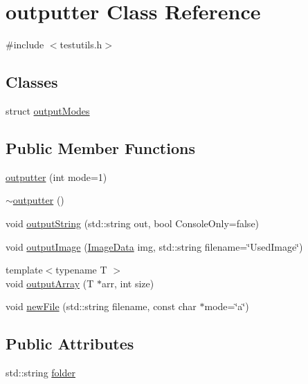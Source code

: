 \hypertarget{classoutputter}{}\section{outputter Class Reference}
\label{classoutputter}


{\ttfamily \#include $<$testutils.\+h$>$}

\subsection*{Classes}
\begin{DoxyCompactItemize}
\item 
struct \hyperlink{structoutputter_1_1output_modes}{output\+Modes}
\end{DoxyCompactItemize}
\subsection*{Public Member Functions}
\begin{DoxyCompactItemize}
\item 
\hyperlink{classoutputter_aebd9b43ac1fef288502f62006751cc8c}{outputter} (int mode=1)
\item 
\hyperlink{classoutputter_ab2c5a4d9f0a5b5f3090836a4ab1243c3}{$\sim$outputter} ()
\item 
void \hyperlink{classoutputter_ab83efb14176854f486bea2b514f39918}{output\+String} (std\+::string out, bool Console\+Only=false)
\item 
void \hyperlink{classoutputter_a8a9f6716fd8a503c8ded2412dfe36c7c}{output\+Image} (\hyperlink{_queued_tracker_8h_a2d6726594ce64e82b9222b183f2571d1}{Image\+Data} img, std\+::string filename=\char`\"{}Used\+Image\char`\"{})
\item 
{\footnotesize template$<$typename T $>$ }\\void \hyperlink{classoutputter_a47f0148cededb6d3feb2c8ed218f4fb7}{output\+Array} (T $\ast$arr, int size)
\item 
void \hyperlink{classoutputter_afab1703273f2af21817699fa68381d5a}{new\+File} (std\+::string filename, const char $\ast$mode=\char`\"{}a\char`\"{})
\end{DoxyCompactItemize}
\subsection*{Public Attributes}
\begin{DoxyCompactItemize}
\item 
std\+::string \hyperlink{classoutputter_a9b6253616c21272f51875f7be5f72861}{folder}
\end{DoxyCompactItemize}
